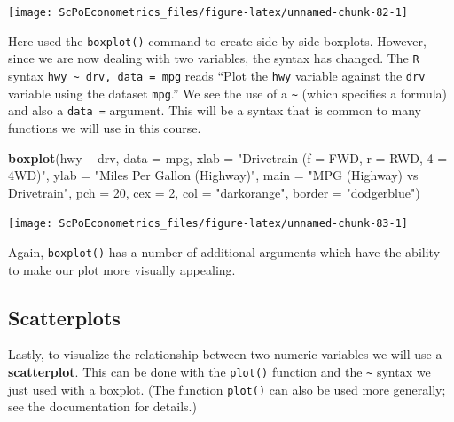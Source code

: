 \documentclass[]{book}
\newenvironment{Shaded}{\begin{snugshade}}{\end{snugshade}}
\newcommand{\DataTypeTok}[1]{\textcolor[rgb]{0.13,0.29,0.53}{#1}}
\newcommand{\DecValTok}[1]{\textcolor[rgb]{0.00,0.00,0.81}{#1}}
\newcommand{\KeywordTok}[1]{\textcolor[rgb]{0.13,0.29,0.53}{\textbf{#1}}}
\newcommand{\NormalTok}[1]{#1}
\newcommand{\OperatorTok}[1]{\textcolor[rgb]{0.81,0.36,0.00}{\textbf{#1}}}
\newcommand{\StringTok}[1]{\textcolor[rgb]{0.31,0.60,0.02}{#1}}
\begin{document}
\begin{center}\texttt{[image: ScPoEconometrics\_files/figure-latex/unnamed-chunk-82-1]} \end{center}

Here used the \texttt{boxplot()} command to create side-by-side boxplots. However, since we are now dealing with two variables, the syntax has changed. The \texttt{R} syntax \texttt{hwy\ \textasciitilde{}\ drv,\ data\ =\ mpg} reads ``Plot the \texttt{hwy} variable against the \texttt{drv} variable using the dataset \texttt{mpg}.'' We see the use of a \texttt{\textasciitilde{}} (which specifies a formula) and also a \texttt{data\ =} argument. This will be a syntax that is common to many functions we will use in this course.

\begin{Shaded}
\begin{Highlighting}[]
\KeywordTok{boxplot}\NormalTok{(hwy }\OperatorTok{~}\StringTok{ }\NormalTok{drv, }\DataTypeTok{data =}\NormalTok{ mpg,}
     \DataTypeTok{xlab   =} \StringTok{"Drivetrain (f = FWD, r = RWD, 4 = 4WD)"}\NormalTok{,}
     \DataTypeTok{ylab   =} \StringTok{"Miles Per Gallon (Highway)"}\NormalTok{,}
     \DataTypeTok{main   =} \StringTok{"MPG (Highway) vs Drivetrain"}\NormalTok{,}
     \DataTypeTok{pch    =} \DecValTok{20}\NormalTok{,}
     \DataTypeTok{cex    =} \DecValTok{2}\NormalTok{,}
     \DataTypeTok{col    =} \StringTok{"darkorange"}\NormalTok{,}
     \DataTypeTok{border =} \StringTok{"dodgerblue"}\NormalTok{)}
\end{Highlighting}
\end{Shaded}

\begin{center}\texttt{[image: ScPoEconometrics\_files/figure-latex/unnamed-chunk-83-1]} \end{center}

Again, \texttt{boxplot()} has a number of additional arguments which have the ability to make our plot more visually appealing.

\hypertarget{scatterplots}{%
\subsection{Scatterplots}\label{scatterplots}}

Lastly, to visualize the relationship between two numeric variables we will use a \textbf{scatterplot}. This can be done with the \texttt{plot()} function and the \texttt{\textasciitilde{}} syntax we just used with a boxplot. (The function \texttt{plot()} can also be used more generally; see the documentation for details.)
\end{document}
